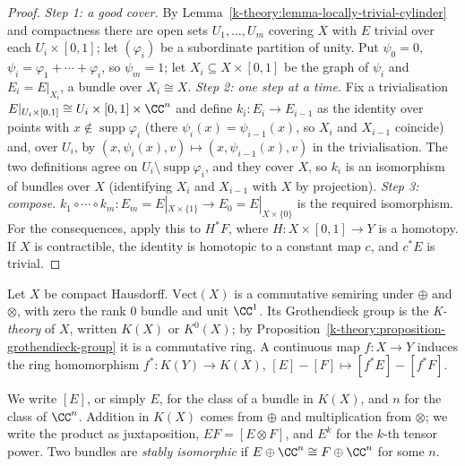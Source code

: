 \begin{proof}
\emph{Step 1: a good cover.} By Lemma~\ref{k-theory:lemma-locally-trivial-cylinder} and compactness there are open sets $U_1, \ldots, U_m$ covering $X$ with $E$ trivial over each $U_i \times [0, 1]$; let
$(\varphi_i)$ be a subordinate partition of unity. Put $\psi_0 = 0$, $\psi_i = \varphi_1 + \cdots + \varphi_i$, so $\psi_m = 1$; let $X_i \subseteq X \times [0, 1]$ be the graph of $\psi_i$ and
$E_i = E|_{X_i}$, a bundle over $X_i \cong X$.
\emph{Step 2: one step at a time.} Fix a trivialisation $E|_{U_i \times [0, 1]} \cong U_i \times [0, 1] \times \CC^n$ and define $k_i \colon E_i \to E_{i-1}$ as the identity over points with
$x \notin \operatorname{supp}\varphi_i$ (there $\psi_i(x) = \psi_{i-1}(x)$, so $X_i$ and $X_{i-1}$ coincide) and, over $U_i$, by $(x, \psi_i(x), v) \mapsto (x, \psi_{i-1}(x), v)$ in the trivialisation. The two
definitions agree on $U_i \setminus \operatorname{supp}\varphi_i$, and they cover $X$, so $k_i$ is an isomorphism of bundles over $X$ (identifying $X_i$ and $X_{i-1}$ with $X$ by projection).
\emph{Step 3: compose.} $k_1 \circ \cdots \circ k_m \colon E_m = E|_{X \times \{1\}} \to E_0 = E|_{X \times \{0\}}$ is the required isomorphism.
For the consequences, apply this to $H^*F$, where $H \colon X \times [0, 1] \to Y$ is a homotopy. If $X$ is contractible, the identity is homotopic to a constant map $c$, and $c^*E$ is trivial.
\end{proof}

\begin{definition}\label{k-theory:definition-k-group}
Let $X$ be compact Hausdorff. $\mathrm{Vect}(X)$ is a commutative semiring under $\oplus$ and $\otimes$, with zero the rank $0$ bundle and unit $\CC^1$. Its Grothendieck group is the
\emph{K-theory} of $X$, written $K(X)$ or $K^0(X)$; by Proposition~\ref{k-theory:proposition-grothendieck-group} it is a commutative ring. A continuous map $f \colon X \to Y$ induces the ring homomorphism
$f^* \colon K(Y) \to K(X)$, $[E] - [F] \mapsto [f^*E] - [f^*F]$.
\end{definition}

\begin{notation}\label{k-theory:notation-k-theory}
We write $[E]$, or simply $E$, for the class of a bundle in $K(X)$, and $n$ for the class of $\CC^n$. Addition in $K(X)$ comes from $\oplus$ and multiplication from $\otimes$; we write the product as
juxtaposition, $EF = [E \otimes F]$, and $E^k$ for the $k$-th tensor power. Two bundles are \emph{stably isomorphic} if $E \oplus \CC^n \cong F \oplus \CC^n$ for some $n$.
\end{notation}

